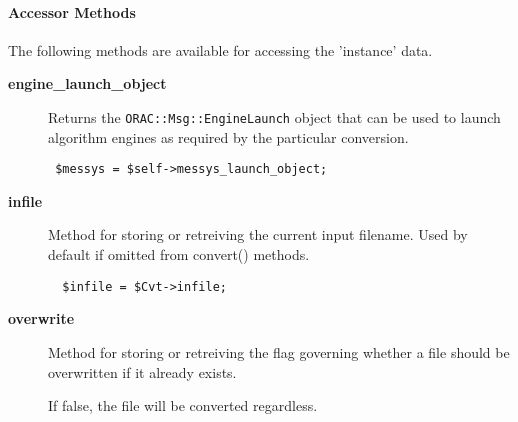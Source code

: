 \paragraph*{Accessor Methods\label{ORAC::Convert_Accessor_Methods}}


The following methods are available for accessing the 
'instance' data.

\begin{description}

\item[\textbf{engine\_launch\_object}] \mbox{}

Returns the \texttt{ORAC::Msg::EngineLaunch} object that can be used
to launch algorithm engines as required by the particular
conversion.

\begin{verbatim}
 $messys = $self->messys_launch_object;
\end{verbatim}

\item[\textbf{infile}] \mbox{}

Method for storing or retreiving the current input filename.
Used by default if omitted from convert() methods.

\begin{verbatim}
  $infile = $Cvt->infile;
\end{verbatim}

\item[\textbf{overwrite}] \mbox{}

Method for storing or retreiving the flag governing whether
a file should be overwritten if it already exists.



If false, the file will be converted regardless.

\end{description}
